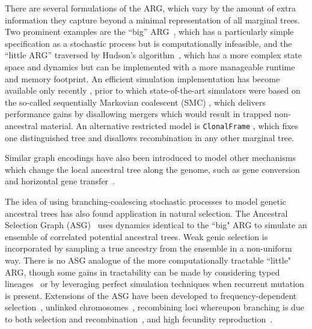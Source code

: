 \documentclass{article}
\begin{document}
There are several formulations of the ARG, which vary by
the amount of extra information they capture beyond a minimal representation
of all marginal trees. Two prominent examples are the ``big''
ARG~\citep{ethier1990two}, which has a particularly simple specification as a
stochastic process but is computationally infeasible, and the ``little ARG''
traversed by Hudson's algorithm~\citep{hudson1983properties}, which
has a more complex state space and dynamics but can be implemented with
a more manageable runtime and memory footprint. An efficient simulation
implementation has become available only recently \citep{kelleher2016efficient},
prior to which state-of-the-art simulators were based on the so-called sequentially
Markovian coalescent (SMC) \citep{mcvean2005approximating}, which delivers
performance gains by disallowing mergers which would result in trapped
non-ancestral material. An alternative restricted model is
\texttt{ClonalFrame}  \citep{didelot2007inference}, which fixes one distinguished
tree and disallows recombination in any other marginal tree.

Similar graph encodings have also been introduced to model other mechanisms
which change the local ancestral tree along the genome, such as gene
conversion~\citep{wiuf2000coalescent} and
horizontal gene transfer~\citep{baumdicker2014infinitely}.

The idea of using branching-coalescing stochastic processes
to model genetic ancestral trees has also found application in natural selection.
The Ancestral Selection Graph (ASG)~\citep{krone1997ancestral,neuhauser1997genealogy}
uses dynamics identical to the ``big" ARG to simulate an ensemble of correlated
potential ancestral trees. Weak genic selection is incorporated by sampling a
true ancestry from the ensemble in a non-uniform way.
There is no ASG analogue of the more computationally tractable ``little" ARG,
though some gains in tractability can be made by considering typed
lineages~\citep{etheridge2009coalescent} or by leveraging perfect simulation
techniques when recurrent mutation is present\citep{fearnhead2001perfect}.
Extensions of the ASG have been developed to frequency-dependent
selection~\citep{neuhauser1999ancestral, gonzalezcasanova2018duality},
unlinked chromosomes~\citep{fearnhead2003ancestral}, recombining
loci whereupon branching is due to both selection and
recombination~\citep{donnelly1999genealogical}, and high fecundity
reproduction~\citep{gonzalezcasanova2018duality, koskela2019robust}.
\end{document}
